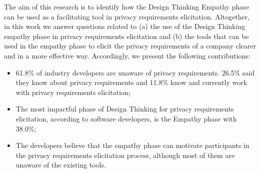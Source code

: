 \documentclass[conference]{IEEEtran}
\begin{document}
The aim of this research is to identify how the Design Thinking Empathy phase can be used as a facilitating tool in privacy requirements elicitation. Altogether, in this work we answer questions related to (a) the use of the Design Thinking empathy phase in privacy requirements elicitation and (b) the tools that can be used in the empathy phase to elicit the privacy requirements of a company clearer and in a more effective way. Accordingly, we present the following contributions:

\begin{itemize}
    \item 61.8\% of industry developers are unaware of privacy requirements. 26.5\% said they know about privacy requirements and 11.8\% know and currently work with privacy requirements elicitation;
    \item  The most impactful phase of Design Thinking for privacy requirements elicitation, according to software developers, is the Empathy phase with 38.0\%;
    \item The developers believe that the empathy phase can motivate participants in the privacy requirements elicitation process, although most of them are unaware of the existing tools.
\end{itemize}

\end{document}
